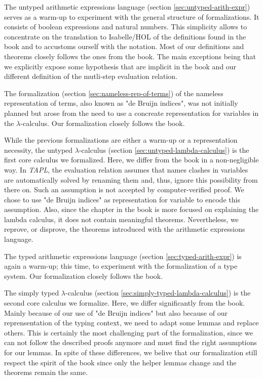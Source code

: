 The untyped arithmetic expressions language (section \ref{sec:untyped-arith-expr}) serves as a
warm-up to experiment with the general structure of formalizations. It consists of boolean
expressions and natural numbers. This simplicity allows to concentrate on the translation to
Isabelle/HOL of the definitions found in the book and to accustoms ourself with the notation. Most
of our definitions and theorems closely follows the ones from the book. The main exceptions being
that we explicitly expose some hypothesis that are implicit in the book and our different definition
of the mutli-step evaluation relation.

The formalization (section \ref{sec:nameless-rep-of-terms}) of the nameless representation of terms,
also known as "de Bruijn indices", was not initially planned but arose from the need to use a
concreate representation for variables in the $\lambda$-calculus. Our formalization closely follows
the book.

While the previous formalizations are either a warm-up or a representation necessity, the untyped
$\lambda$-calculus (section \ref{sec:untyped-lambda-calculus}) is the first core calculus we
formalized. Here, we differ from the book in a non-negligible way. In \emph{TAPL}, the evaluation
relation assumes that names clashes in variables are automatically solved by renaming them and,
thus, ignore this possibility from there on. Such an assumption is not accepted by computer-verified
proof. We chose to use "de Bruijn indices" as representation for variable to encode this
assumption. Also, since the chapter in the book is more focused on explaining the lambda calculus,
it does not contain meaningful theorems. Nevertheless, we reprove, or disprove, the theorems
introduced with the arithmetic expressions language.

The typed arithmetic expressions language (section \ref{sec:typed-arith-expr}) is again a warm-up;
this time, to experiment with the formalization of a type system. Our formalization closely follows
the book.

The simply typed $\lambda$-calculus (section \ref{sec:simply-typed-lambda-calculus}) is the second
core calculus we formalize. Here, we differ significantly from the book. Mainly because of our use
of "de Bruijn indices" but also because of our reprensentation of the typing context, we need to
adapt some lemmas and replace others. This is certainly the most challenging part of the
formalization, since we can not follow the described proofs anymore and must find the right
assumptions for our lemmas.  In spite of these differences, we belive that our formalization still
respect the spirit of the book since only the helper lemmas change and the theorems remain the same.

